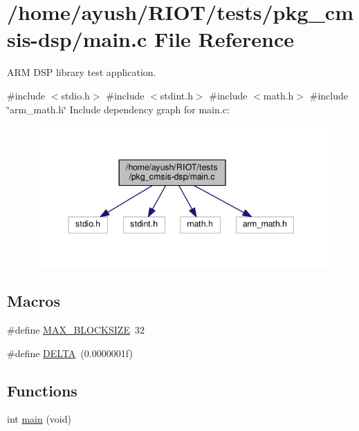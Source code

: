 \hypertarget{pkg__cmsis-dsp_2main_8c}{}\section{/home/ayush/\+R\+I\+O\+T/tests/pkg\+\_\+cmsis-\/dsp/main.c File Reference}
\label{pkg__cmsis-dsp_2main_8c}


A\+RM D\+SP library test application.  


{\ttfamily \#include $<$stdio.\+h$>$}\newline
{\ttfamily \#include $<$stdint.\+h$>$}\newline
{\ttfamily \#include $<$math.\+h$>$}\newline
{\ttfamily \#include \char`\"{}arm\+\_\+math.\+h\char`\"{}}\newline
Include dependency graph for main.\+c\+:
\nopagebreak
\begin{figure}[H]
\begin{center}
\leavevmode
\includegraphics[width=345pt]{pkg__cmsis-dsp_2main_8c__incl}
\end{center}
\end{figure}
\subsection*{Macros}
\begin{DoxyCompactItemize}
\item 
\#define \hyperlink{pkg__cmsis-dsp_2main_8c_af8a1d2ed31f7c9a00fec46a798edb61b}{M\+A\+X\+\_\+\+B\+L\+O\+C\+K\+S\+I\+ZE}~32
\item 
\#define \hyperlink{pkg__cmsis-dsp_2main_8c_a3fd2b1bcd7ddcf506237987ad780f495}{D\+E\+L\+TA}~(0.\+0000001f)
\end{DoxyCompactItemize}
\subsection*{Functions}
\begin{DoxyCompactItemize}
\item 
int \hyperlink{pkg__cmsis-dsp_2main_8c_a840291bc02cba5474a4cb46a9b9566fe}{main} (void)
\end{DoxyCompactItemize}
